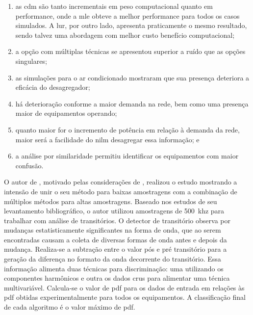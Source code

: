 \begin{enumerate}[label=\textbf{2.\arabic*},wide=\parindent]
\begin{enumerate}[label=\itshape\alph*\upshape)]
\item as \gls{cdm} são tanto incrementais em peso computacional quanto
em performance, onde a \gls{mle} obteve a melhor performance para
todos os casos simulados. A \gls{lur}, por outro lado, apresenta
praticamente o mesmo resultado, sendo talvez uma abordagem com melhor
custo benefício computacional;
\item a opção com múltiplas técnicas se apresentou superior a
ruído que as opções singulares;
\item as simulações para o ar condicionado mostraram que sua presença
deteriora a eficácia do desagregador;
\item há deterioração conforme a maior demanda na rede, bem como uma
presença maior de equipamentos operando;
\item quanto maior for o incremento de potência em relação à demanda
da rede, maior será a facilidade do \gls{nilm} desagregar essa
informação; e
\item a análise por similaridade permitiu identificar os equipamentos com
maior confusão.
\end{enumerate}

O autor de \cite{nilm_zeifman_review_2011}, motivado pelas
considerações de \cite{nilm_liang_pt2_2010_40}, realizou o estudo
\cite{nilm_zeifman_vast_hisample_pdfmerge_2011} mostrando a intensão
de unir o seu método para baixas amostragens
\cite{nilm_zeifman_vast_2011} com a combinação de múltiplos métodos
para altas amostragens. Baseado nos estudos de seu levantamento
bibliográfico, o autor utilizou amostragens de 500~k\acs{hz} para
trabalhar com análise de transitórios. O detector de transitório
observa por mudanças estatisticamente significantes na forma de onda,
que ao serem encontradas causam a coleta de diversas formas de onda
antes e depois da mudança. Realiza-se a subtração entre o valor pós e
pré transitório para a geração da diferença no formato da onda
decorrente do transitório. Essa informação alimenta duas técnicas para
discriminação: uma utilizando os componentes harmônicos e outra os
dados crus para alimentar uma técnica multivariável. Calcula-se o
valor de \acs{pdf} para os dados de entrada em relações às
\acs{pdf} obtidas experimentalmente para todos os equipamentos. A
classificação final de cada algoritmo é o valor máximo de
\acs{pdf}.


\end{enumerate}
